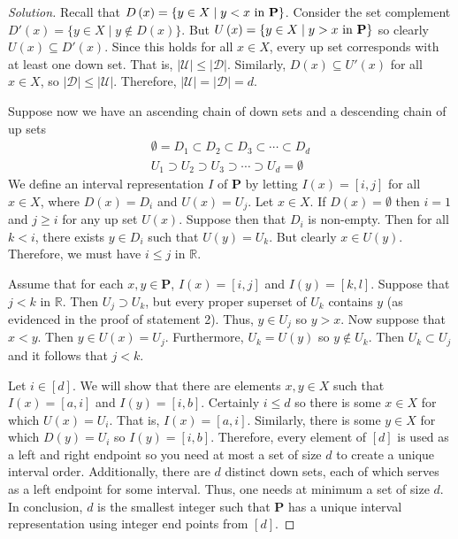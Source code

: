 \documentclass[12pt]{article}
\theoremstyle{definition}
\newenvironment{solution}{
  \begin{proof}[Solution]
    \vspace{-8px}
    \setlength{\parskip}{4px}
    \setlength{\parindent}{0px}
}{
\end{proof}
}
\begin{document}
  \begin{solution}
    Recall that \(D \left( x \right) = \{y \in X \mid y < x \text{ in \textbf{P}}\}\).
    Consider the set complement \(D' \left( x \right) = \{y \in X \mid y \notin D \left( x \right) \}\).
    But \(U \left( x \right) = \{y \in X \mid y > x \text{ in \textbf{P}}\}\) so clearly \(U \left( x \right) \subseteq D' \left( x \right)\).
    Since this holds for all \(x \in X\), every up set corresponds with at least one down set.
    That is, \(| \mathcal{U} | \leq | \mathcal{D} |\).
    Similarly, \(D \left( x \right) \subseteq U' \left( x \right)\) for all \(x \in X\), so \(| \mathcal{D} | \leq | \mathcal{U} |\).
    Therefore, \(| \mathcal{U} | = | \mathcal{D} | = d\).

    Suppose now we have an ascending chain of down sets and a descending chain of up sets
    \begin{align*}
      \emptyset = D_{1} \subset D_{2} \subset D_{3} \subset \cdots \subset D_{d} \\
      U_{1} \supset U_{2} \supset U_{3} \supset \cdots \supset U_{d} = \emptyset
    \end{align*}
    We define an interval representation \(I\) of \textbf{P} by letting \(I \left( x \right) = [i, j]\) for all \(x \in X\), where \(D \left( x \right) = D_{i}\) and \(U \left( x \right) = U_{j}\).
    Let \(x \in X\). If \(D \left( x \right) = \emptyset\) then \(i = 1\) and \(j \geq i\) for any up set \(U \left( x \right)\).
    Suppose then that \(D_{i}\) is non-empty.
    Then for all \(k < i\), there exists \(y \in D_{i}\) such that \(U \left( y \right) = U_{k}\).
    But clearly \(x \in U \left( y \right)\).
    Therefore, we must have \(i \leq j\) in \(\mathbb{R}\).

    Assume that for each \(x, y \in \textbf{P}\), \(I \left( x \right) = [i, j]\) and \(I \left( y \right) = [k, l]\).
    Suppose that \(j < k\) in \(\mathbb{R}\).
    Then \(U_{j} \supset U_{k}\), but every proper superset of \(U_{k}\) contains \(y\) (as evidenced in the proof of statement 2).
    Thus, \(y \in U_{j}\) so \(y > x\).
    Now suppose that \(x < y\).
    Then \(y \in U \left( x \right) = U_{j}\).
    Furthermore, \(U_{k} = U \left( y \right)\) so \(y \notin U_{k}\).
    Then \(U_{k} \subset U_{j}\) and it follows that \(j < k\).

    Let \(i \in [d]\). We will show that there are elements \(x, y \in X\) such that \(I \left( x \right) = [a, i]\) and \(I \left( y \right) = [i, b]\).
    Certainly \(i \leq d\) so there is some \(x \in X\) for which \(U \left( x \right) = U_{i}\). That is, \(I \left( x \right) = [a, i]\).
    Similarly, there is some \(y \in X\) for which \(D \left( y \right) = U_{i}\) so \(I \left( y \right) = [i, b]\).
    Therefore, every element of \([d]\) is used as a left and right endpoint so you need at most a set of size \(d\) to create a unique interval order.
    Additionally, there are \(d\) distinct down sets, each of which serves as a left endpoint for some interval. Thus, one needs at minimum a set of size \(d\).
    In conclusion, \(d\) is the smallest integer such that \textbf{P} has a unique interval representation using integer end points from \([d]\).

  \end{solution}
\end{document}
